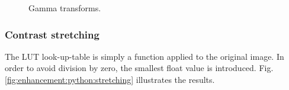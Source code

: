 \begin{figure}[H]
 \centering\caption{Gamma transforms.}%
 \hfill
 
  \hfill
 \vspace*{-5pt}%
 \label{fig:enhancement:python:gamma}%
\end{figure}

\subsubsection{Contrast stretching}
The LUT look-up-table is simply a function applied to the original image. In order to avoid division by zero, the smallest float value is introduced. Fig.\ref{fig:enhancement:python:stretching} illustrates the results.

